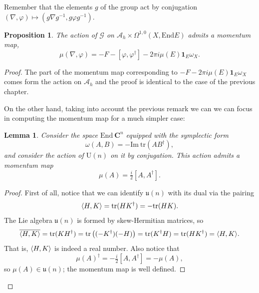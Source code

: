 \documentclass[12pt,a4paper]{book}
\newtheorem{prop}[thm]{Proposition}
\newtheorem{lema}[thm]{Lemma}
\theoremstyle{definition} \newtheorem{defn}[thm]{Definition}
\theoremstyle{definition} \newtheorem{ejemplo}[thm]{Example}
\theoremstyle{remark} \newtheorem{rem}[thm]{Remark}
\def\AA{\mathscr{A}}
\def\GG{\mathscr{G}}
\def\CC{\mathbf{C}}
\def\tr{\mathrm{tr}}
\def\id{\mathbf{1}}
\def\End{\mathrm{End}}
\def\UU{\mathrm{U}}
\def\uu{\mathfrak{u}}
\DeclarePairedDelimiter\esc{\langle}{\rangle}
\begin{document}
	  Remember that the elements $g$ of the group act by conjugation $(\nabla,\varphi)\mapsto (g\nabla g^{-1},g\varphi g^{-1})$. 
	  \begin{prop}
	    The action of $\GG$ on $\AA_h\times \Omega^{1,0}(X,\End E)$ admits a momentum map,
	  \begin{equation*}
	    \mu(\nabla,\varphi)=-F-[\varphi,\varphi^\dagger]-2\pi i \mu(E) \id_E \omega_X.
	  \end{equation*}
	  \end{prop}
	  \begin{proof}
	    The part of the momentum map corresponding to $-F-2\pi i \mu(E) \id_E \omega_X$ comes form the action on $\AA_h$ and the proof is identical to the case of the previous chapter. 
	    
	    On the other hand, taking into account the previous remark we can we can focus in computing the momentum map for a much simpler case:
	    \begin{lema}
	    Consider the space $\End\ \CC^n$ equipped with the symplectic form
	    \begin{equation*}
	      \omega(A,B)=-\mathrm{Im}\ \tr(AB^{\dagger}),
	    \end{equation*}
	    and consider the action of $\UU(n)$ on it by conjugation. This action admits a momentum map
	    \begin{equation*}
	      \mu(A)= \tfrac{i}{2} [A,A^{\dagger}].
	    \end{equation*}
	    \end{lema}
	    \begin{proof}
	      First of all, notice that we can identify $\uu(n)$ with its dual via the pairing
	      \begin{equation*}
		\esc{H,K}=\tr(HK^\dagger)=-\tr(HK).
	      \end{equation*}
	      The Lie algebra $\uu(n)$ is formed by skew-Hermitian matrices, so
	      \begin{equation*}
		\overline{\esc{H,K}}=\tr(KH^\dagger)=\tr\left( (-K^\dagger)(-H) \right)=\tr (K^\dagger H) =\tr (HK^\dagger ) = \esc{H,K}.
	      \end{equation*}
	      That is, $\esc{H,K}$ is indeed a real number. Also notice that 
	      \begin{equation*}
		\mu(A)^{\dagger}=-\tfrac{i}{2}[A,A^{\dagger}]=-\mu(A),
	      \end{equation*}
	      so $\mu(A) \in \uu(n)$; the momentum map is well defined.
	      

\end{proof}
\end{proof}
\end{document}
